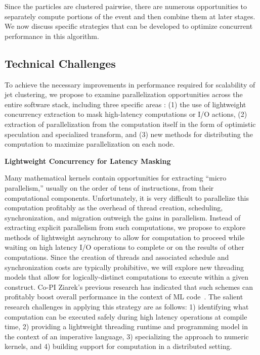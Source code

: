 \documentclass[times,11pt]{article}
\begin{document}
Since the particles are clustered pairwise, there are numerous
opportunities to separately compute portions of the event and then
combine them at later stages. 
We now
discuss specific strategies that can be developed 
to optimize concurrent performance in this algorithm. 

\subsection{Technical Challenges}

To achieve the necessary improvements in performance required for scalability
of jet clustering, we propose to examine parallelization opportunities across
the entire software stack, including three specific areas : 
(1) the use of lightweight concurrency
extraction to mask high-latency computations or I/O actions, 
(2) extraction of
parallelization from the computation itself in the form of optimistic speculation
and specialized transform, and
(3) new methods for distributing the computation to
maximize parallelization on each node. 


\bigskip
\noindent
{\bf  Lightweight Concurrency for Latency Masking}
\bigskip

Many mathematical kernels contain opportunities for extracting ``micro parallelism,''
usually on the order of tens of instructions, from their computational components. 
Unfortunately, it is very difficult to parallelize this computation profitably as
the overhead of thread creation, scheduling, synchronization, and migration outweigh
the gains in parallelism. Instead of extracting explicit parallelism from such
computations, we propose to explore methods of lightweight asynchrony to allow for
computation to proceed while waiting on high latency I/O operations to complete or on
the results of other computations. Since the creation of threads and associated
schedule and synchronization costs are typically prohibitive, we will explore new
threading models that allow for logically-distinct computations to execute within
a given construct. Co-PI Ziarek's previous research has indicated that such schemes can profitably
boost overall performance in the context of ML code~\cite{acml, parasites}. 
The salient research
challenges in applying this strategy are as follows:  1) identifying what computation can be executed
safely during high latency operations at compile time, 2) providing a lightweight threading runtime
and programming model in the context of an imperative language, 
3) specializing the approach to numeric kernels,
and 4) building support for computation in a distributed setting.
\end{document}

